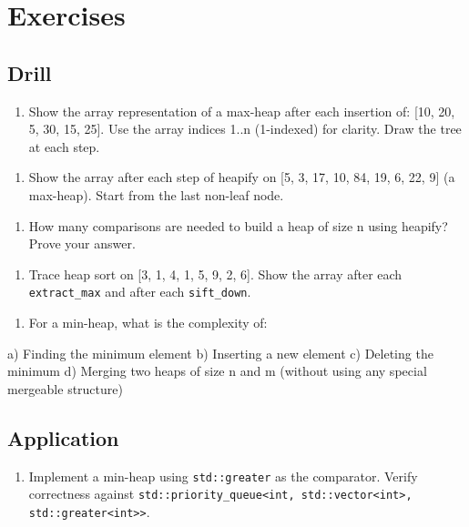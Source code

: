 \section{Exercises}

\subsection{Drill}

\begin{enumerate}
\item Show the array representation of a max-heap after each insertion of: [10, 20, 5, 30, 15, 25]. Use the array indices 1..n (1-indexed) for clarity. Draw the tree at each step.
\end{enumerate}

\begin{enumerate}
\item Show the array after each step of heapify on [5, 3, 17, 10, 84, 19, 6, 22, 9] (a max-heap). Start from the last non-leaf node.
\end{enumerate}

\begin{enumerate}
\item How many comparisons are needed to build a heap of size n using heapify? Prove your answer.
\end{enumerate}

\begin{enumerate}
\item Trace heap sort on [3, 1, 4, 1, 5, 9, 2, 6]. Show the array after each \texttt{extract\_max} and after each \texttt{sift\_down}.
\end{enumerate}

\begin{enumerate}
\item For a min-heap, what is the complexity of:
\end{enumerate}
   a) Finding the minimum element
   b) Inserting a new element
   c) Deleting the minimum
   d) Merging two heaps of size n and m (without using any special mergeable structure)

\subsection{Application}

\begin{enumerate}
\item Implement a min-heap using \texttt{std::greater} as the comparator. Verify correctness against \texttt{std::priority\_queue<int, std::vector<int>, std::greater<int>>}.
\end{enumerate}

